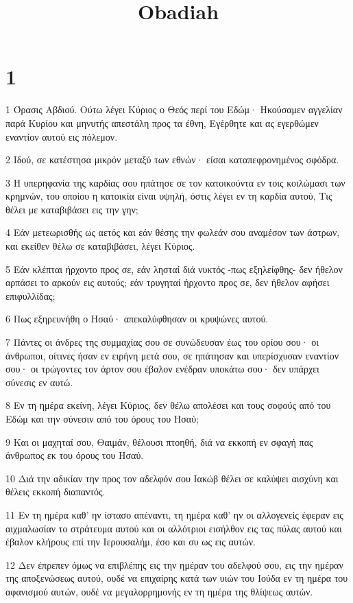 

\title{Obadiah}


\chapter{1}

\par 1 Όρασις Αβδιού. Ούτω λέγει Κύριος ο Θεός περί του Εδώμ· Ηκούσαμεν αγγελίαν παρά Κυρίου και μηνυτής απεστάλη προς τα έθνη, Εγέρθητε και ας εγερθώμεν εναντίον αυτού εις πόλεμον.
\par 2 Ιδού, σε κατέστησα μικρόν μεταξύ των εθνών· είσαι καταπεφρονημένος σφόδρα.
\par 3 Η υπερηφανία της καρδίας σου ηπάτησε σε τον κατοικούντα εν τοις κοιλώμασι των κρημνών, του οποίου η κατοικία είναι υψηλή, όστις λέγει εν τη καρδία αυτού, Τις θέλει με καταβιβάσει εις την γην;
\par 4 Εάν μετεωρισθής ως αετός και εάν θέσης την φωλεάν σου αναμέσον των άστρων, και εκείθεν θέλω σε καταβιβάσει, λέγει Κύριος.
\par 5 Εάν κλέπται ήρχοντο προς σε, εάν λησταί διά νυκτός -πως εξηλείφθης- δεν ήθελον αρπάσει το αρκούν εις αυτούς; εάν τρυγηταί ήρχοντο προς σε, δεν ήθελον αφήσει επιφυλλίδας;
\par 6 Πως εξηρευνήθη ο Ησαύ· απεκαλύφθησαν οι κρυψώνες αυτού.
\par 7 Πάντες οι άνδρες της συμμαχίας σου σε συνώδευσαν έως του ορίου σου· οι άνθρωποι, οίτινες ήσαν εν ειρήνη μετά σου, σε ηπάτησαν και υπερίσχυσαν εναντίον σου· οι τρώγοντες τον άρτον σου έβαλον ενέδραν υποκάτω σου· δεν υπάρχει σύνεσις εν αυτώ.
\par 8 Εν τη ημέρα εκείνη, λέγει Κύριος, δεν θέλω απολέσει και τους σοφούς από του Εδώμ και την σύνεσιν από του όρους του Ησαύ;
\par 9 Και οι μαχηταί σου, Θαιμάν, θέλουσι πτοηθή, διά να εκκοπή εν σφαγή πας άνθρωπος εκ του όρους του Ησαύ.
\par 10 Διά την αδικίαν την προς τον αδελφόν σου Ιακώβ θέλει σε καλύψει αισχύνη και θέλεις εκκοπή διαπαντός.
\par 11 Εν τη ημέρα καθ' ην ίστασο απέναντι, τη ημέρα καθ' ην οι αλλογενείς έφεραν εις αιχμαλωσίαν το στράτευμα αυτού και οι αλλότριοι εισήλθον εις τας πύλας αυτού και έβαλον κλήρους επί την Ιερουσαλήμ, έσο και συ ως εις αυτών.
\par 12 Δεν έπρεπεν όμως να επιβλέπης εις την ημέραν του αδελφού σου, εις την ημέραν της αποξενώσεως αυτού, ουδέ να επιχαίρης κατά των υιών του Ιούδα εν τη ημέρα του αφανισμού αυτών, ουδέ να μεγαλορρημονής εν τη ημέρα της θλίψεως αυτών.
